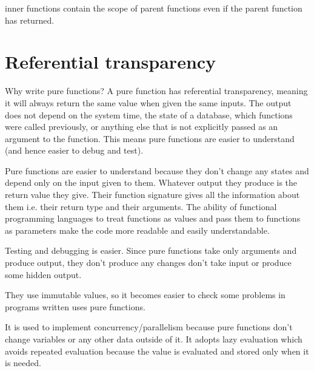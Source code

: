  
inner functions contain the scope 
of parent functions even if the parent function has returned.
 


\newpage  
\section{Referential transparency}  


  Why write pure functions? A pure function has referential transparency, meaning it will always return the same value when given the same 
  inputs. The output does not depend on the system time, the state of a database, which functions were called previously, or anything else 
  that is not explicitly passed as an argument to the function. This means pure functions are easier to understand (and hence easier to debug 
  and test).



Pure functions are easier to understand because 
they don’t change any states and depend only on the input given to them. 
Whatever output they 
produce is the return value they give. 
Their function signature gives all the information 
about them i.e. their return type and their 
arguments.
The ability of functional programming languages to treat functions as values and pass them to functions as parameters make the code more 
readable and easily understandable.

Testing and debugging is easier. 
Since pure functions take only arguments and produce output, they don’t produce any changes don’t take input 
or produce some hidden output. 

They use immutable values, 
so it becomes easier to check some problems in programs 
written uses pure functions.

It is used to implement concurrency/parallelism because pure functions 
don’t change variables or any other data outside of it.
It adopts lazy evaluation which avoids repeated evaluation
because the value is evaluated and stored only when it is needed.



  
  
  